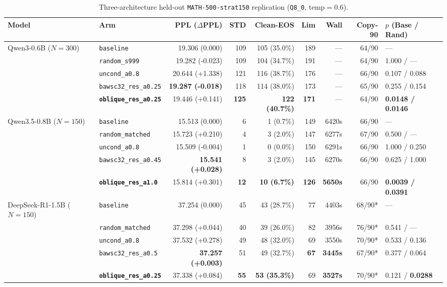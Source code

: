 \documentclass[11pt,letterpaper]{article}
\begin{document}
\begin{table}[t]
\centering
\caption{Three-architecture held-out \texttt{MATH-500-strat150} replication (\texttt{Q8\_0}, $\text{temp}=0.6$).}
\label{tab:p1main}
\scriptsize
\begin{tabular}{llrrrrrrl}
\toprule
Model & Arm & PPL ($\Delta$PPL) & STD & Clean-EOS & Lim & Wall & Copy-90 & $p$ (Base / Rand) \\
\midrule
Qwen3-0.6B ($N=300$) & \texttt{baseline} & 19.306 (0.000) & 109 & 105 (35.0\%) & 189 & --- & 64/90 & --- \\
& \texttt{random\_s999} & 19.282 (-0.023) & 109 & 104 (34.7\%) & 191 & --- & 64/90 & 1.000 / --- \\
& \texttt{uncond\_a0.8} & 20.644 (+1.338) & 121 & 116 (38.7\%) & 176 & --- & 66/90 & 0.107 / 0.088 \\
& \texttt{bawsc32\_res\_a0.25} & \textbf{19.287 (-0.018)} & 118 & 114 (38.0\%) & 173 & --- & 65/90 & 0.255 / 0.154 \\
& \textbf{\texttt{oblique\_res\_a0.25}} & 19.446 (+0.141) & \textbf{125} & \textbf{122 (40.7\%)} & \textbf{171} & --- & 64/90 & \textbf{0.0148 / 0.0146} \\
\midrule
Qwen3.5-0.8B ($N=150$) & \texttt{baseline} & 15.513 (0.000) & 6 & 1 (0.7\%) & 149 & 6420s & 66/90 & --- \\
& \texttt{random\_matched} & 15.723 (+0.210) & 4 & 3 (2.0\%) & 147 & 6277s & 67/90 & 0.500 / --- \\
& \texttt{uncond\_a0.8} & 15.509 (-0.004) & 1 & 0 (0.0\%) & 150 & 6291s & 66/90 & 1.000 / 0.250 \\
& \texttt{bawsc32\_res\_a0.45} & \textbf{15.541 (+0.028)} & 8 & 3 (2.0\%) & 145 & 6270s & 66/90 & 0.625 / 1.000 \\
& \textbf{\texttt{oblique\_res\_a1.0}} & 15.814 (+0.301) & \textbf{12} & \textbf{10 (6.7\%)} & \textbf{126} & \textbf{5650s} & 66/90 & \textbf{0.0039 / 0.0391} \\
\midrule
DeepSeek-R1-1.5B ($N=150$) & \texttt{baseline} & 37.254 (0.000) & 45 & 43 (28.7\%) & 77 & 4403s & 68/90* & --- \\
& \texttt{random\_matched} & 37.298 (+0.044) & 40 & 39 (26.0\%) & 82 & 3956s & 76/90* & 0.541 / --- \\
& \texttt{uncond\_a0.8} & 37.532 (+0.278) & 49 & 48 (32.0\%) & 69 & 3550s & 70/90* & 0.533 / 0.136 \\
& \texttt{bawsc32\_res\_a0.5} & \textbf{37.257 (+0.003)} & 51 & 49 (32.7\%) & \textbf{67} & \textbf{3445s} & 67/90* & 0.377 / 0.064 \\
& \textbf{\texttt{oblique\_res\_a0.25}} & 37.338 (+0.084) & \textbf{55} & \textbf{53 (35.3\%)} & 69 & \textbf{3527s} & 70/90* & 0.121 / \textbf{0.0288} \\
\bottomrule
\end{tabular}
\end{table}
\end{document}

